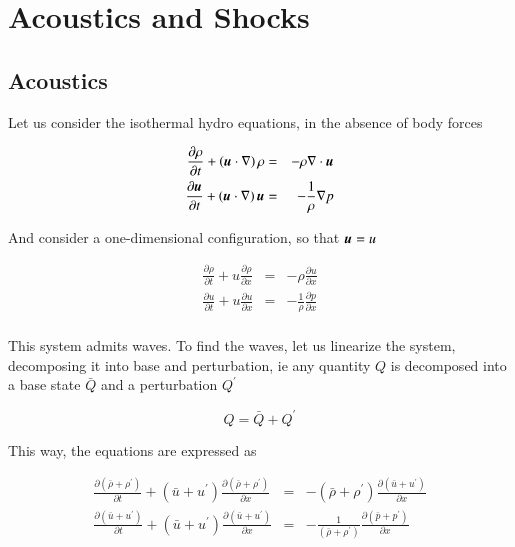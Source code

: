 

\chapter{Acoustics and Shocks}
\label{ch:shocks}

\section{Acoustics}

Let us consider the isothermal hydro equations, in the absence of body forces 

\begin{eqnarray}
\frac{\partial \rho}{\partial t}  + \left({\boldsymbol{u}}\cdot \nabla\right)\rho  &=& -\rho \nabla \cdot {\boldsymbol{u}}   \\
\frac{\partial {\boldsymbol{u}}}{\partial t}  +  \left({\boldsymbol{u}}\cdot \nabla\right) {\boldsymbol{u}} &=& -\frac{1}{\rho} \nabla p 
\end{eqnarray}




And consider a one-dimensional configuration, so that ${\boldsymbol{u}}=u$

\begin{eqnarray}
\frac{\partial \rho}{\partial t}  + u\frac{\partial \rho}{\partial x} &=& -\rho\frac{\partial u}{\partial x}    \\
\frac{\partial u}{\partial t}  +  u\frac{\partial u}{\partial x} &=& -\frac{1}{\rho} \frac{\partial p}{\partial x}  \\
\end{eqnarray}

This system admits waves. To find the waves, let us linearize the system, decomposing it into base and perturbation, ie any quantity $Q$ is decomposed into a base state $\bar{Q}$ and a perturbation $Q^\prime$

\begin{equation}
Q = \bar{Q} + Q^\prime
\end{equation}

This way, the equations are expressed as  


\begin{eqnarray}
\frac{\partial (\bar{\rho}+\rho^\prime)}{\partial t}  + (\bar{u}+u^\prime)\frac{\partial (\bar{\rho}+\rho^\prime)}{\partial x} &=& -(\bar{\rho}+\rho^\prime)\frac{\partial (\bar{u}+u^\prime)}{\partial x}   \\
\frac{\partial (\bar{u}+u^\prime)}{\partial t}  +  (\bar{u}+u^\prime)\frac{\partial (\bar{u}+u^\prime)}{\partial x} &=& -\frac{1}{(\bar{\rho}+\rho^\prime)} \frac{\partial (\bar{p}+p^\prime)}{\partial x} 
\end{eqnarray}

